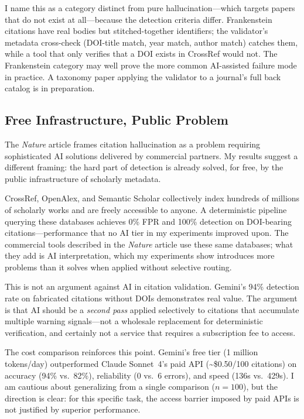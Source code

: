 I name this as a category distinct from pure hallucination---which targets papers that do not exist at all---because the detection criteria differ. Frankenstein citations have real bodies but stitched-together identifiers; the validator's metadata cross-check (DOI-title match, year match, author match) catches them, while a tool that only verifies that a DOI exists in CrossRef would not. The Frankenstein category may well prove the more common AI-assisted failure mode in practice. A taxonomy paper applying the validator to a journal's full back catalog is in preparation.

\subsection{Free Infrastructure, Public Problem}

The \textit{Nature} article frames citation hallucination as a problem requiring sophisticated AI solutions delivered by commercial partners. My results suggest a different framing: the hard part of detection is already solved, for free, by the public infrastructure of scholarly metadata.

CrossRef, OpenAlex, and Semantic Scholar collectively index hundreds of millions of scholarly works and are freely accessible to anyone. A deterministic pipeline querying these databases achieves 0\% FPR and 100\% detection on DOI-bearing citations---performance that no AI tier in my experiments improved upon. The commercial tools described in the \textit{Nature} article use these same databases; what they add is AI interpretation, which my experiments show introduces more problems than it solves when applied without selective routing.

This is not an argument against AI in citation validation. Gemini's 94\% detection rate on fabricated citations without DOIs demonstrates real value. The argument is that AI should be a \emph{second pass} applied selectively to citations that accumulate multiple warning signals---not a wholesale replacement for deterministic verification, and certainly not a service that requires a subscription fee to access.

The cost comparison reinforces this point. Gemini's free tier (1 million tokens/day) outperformed Claude Sonnet~4's paid API (\textasciitilde\$0.50/100 citations) on accuracy (94\% vs.\ 82\%), reliability (0 vs.\ 6 errors), and speed (136s vs.\ 429s). I am cautious about generalizing from a single comparison ($n=100$), but the direction is clear: for this specific task, the access barrier imposed by paid APIs is not justified by superior performance.

